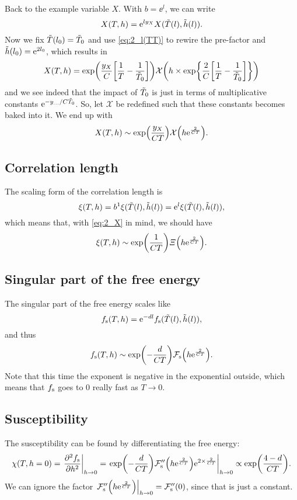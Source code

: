 \documentclass[11pt,letter, swedish, english
]{article}
\begin{document}
Back to the example variable $X$. With $b=\ee^l$, we can write
\begin{equation}
X(T, h) = \mathrm{e}^{ly_X} X(\tilde{T}(l), \tilde{h}(l)).
\end{equation}
Now we fix $\tilde{T}(l_0)=\tilde{T}_0$ and use \eqref{eq:2_l(TT)} to rewire the
pre-factor and $\tilde{h}(l_0) = \mathrm{e}^{2l_0}$, which results in
\begin{equation}
X(T, h) = \exp(\frac{y_X}{C}\qty[\frac{1}{T}-\frac{1}{\tilde{T}_0}])
\mathcal{X}\qty(h\times\exp{\frac{2}{C}\qty[\frac{1}{T}-\frac{1}{\tilde{T}_0}]})
\end{equation}
and we see indeed that the impact of $\tilde{T}_0$ is just in terms of
multiplicative constants $\mathrm{e}^{-y_{...}/C\tilde{T}_0}$. So, let
$\mathcal{X}$ be redefined such that these constants becomes baked
into it. We end up with
\begin{equation}\label{eq:2_X}
X(T, h) \sim \exp(\frac{y_X}{CT})
\mathcal{X}\qty(h\mathrm{e}^{\frac{2}{CT}}).
\end{equation}


\subsection{Correlation length}
The scaling form of the correlation length is
\begin{equation}
\xi(T, h) = b^1 \xi(\tilde{T}(l), \tilde{h}(l))= \mathrm{e}^l \xi(\tilde{T}(l), \tilde{h}(l)),
\end{equation}
which means that, with \eqref{eq:2_X} in mind, we should have
\begin{equation}
\xi(T, h)  \sim \exp(\frac{1}{CT})
\varXi\qty(h\mathrm{e}^{\frac{2}{CT}}).
\end{equation}

\subsection{Singular part of the free energy}
The singular part of the free energy scales like
\begin{equation}
f_{\text{s}}(T, h) = \mathrm{e}^{-dl}f_{\text{s}}(\tilde{T}(l), \tilde{h}(l)),
\end{equation}
and thus
\begin{equation}
f_{\text{s}}(T, h) \sim \exp(-\frac{d}{CT})
\mathcal{F}_\text{s}\qty(h\mathrm{e}^{\frac{2}{CT}}).
\end{equation}
Note that this time the exponent is negative in the exponential
outside, which means that $f_{\text{s}}$ goes to 0 really fast as $T\to0$. 

\subsection{Susceptibility}
The susceptibility can be found by differentiating the free energy:
\begin{equation}
\chi(T, h=0) = \eval{\pdv[2]{\fs}{h}}_{h\to0}
=\eval{\exp(-\frac{d}{CT})
\mathcal{F}_\text{s}''\qty(h\ee^{\frac{2}{CT}})\ee^{2\times\frac{2}{CT}}
}_{h\to0}
\propto \exp(\frac{4-d}{CT}).
\end{equation}
We can ignore the factor 
$\eval{\mathcal{F}_\text{s}''\qty(h\ee^{\frac{2}{CT}})}_{h\to0} 
= \mathcal{F}_\text{s}''(0)$, since that is just a constant. 
\end{document}

